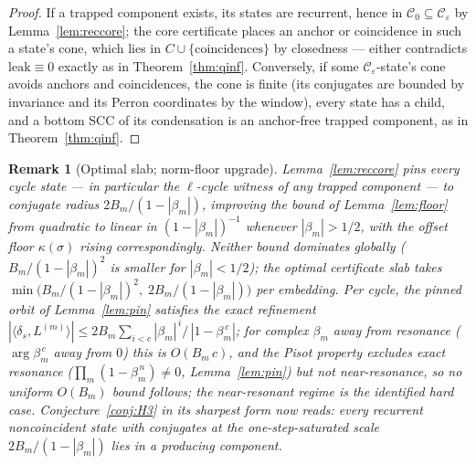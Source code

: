 \documentclass[11pt]{article}
\newtheorem{remark}[theorem]{Remark}
\begin{document}
\begin{proof}
If a trapped component exists, its states are recurrent, hence in
$\mathcal{C}_0\subseteq\mathcal{C}_\varepsilon$ by
Lemma~\ref{lem:reccore}; the core certificate places an anchor or
coincidence in such a state's cone, which lies in
$C\cup\{\text{coincidences}\}$ by closedness --- either contradicts
$\mathrm{leak}\equiv0$ exactly as in Theorem~\ref{thm:qinf}.
Conversely, if some $\mathcal{C}_\varepsilon$-state's cone avoids
anchors and coincidences, the cone is finite (its conjugates are
bounded by invariance and its Perron coordinates by the window), every
state has a child, and a bottom SCC of its condensation is an
anchor-free trapped component, as in Theorem~\ref{thm:qinf}.
\end{proof}

\begin{remark}[Optimal slab; norm-floor upgrade]\label{rem:optslab}
Lemma~\ref{lem:reccore} pins every cycle state --- in particular the
$\ell$-cycle witness of any trapped component --- to conjugate radius
$2B_m/(1-|\beta_m|)$, improving the bound of Lemma~\ref{lem:floor} from
quadratic to linear in $(1-|\beta_m|)^{-1}$ whenever $|\beta_m|>1/2$,
with the offset floor $\kappa(\sigma)$ rising correspondingly. Neither
bound dominates globally ($B_m/(1-|\beta_m|)^2$ is smaller for
$|\beta_m|<1/2$); the optimal certificate slab takes
$\min\bigl(B_m/(1-|\beta_m|)^2,\;2B_m/(1-|\beta_m|)\bigr)$ per
embedding. Per cycle, the pinned orbit of Lemma~\ref{lem:pin}
satisfies the exact refinement
$|\langle\delta_s,L^{(m)}\rangle|\le
2B_m\sum_{i<c}|\beta_m|^{\,i}/\,|1-\beta_m^{\,c}|$; for complex
$\beta_m$ away from resonance ($\arg\beta_m^{\,c}$ away from $0$) this
is $O(B_m\,c)$, and the Pisot property excludes exact resonance
($\prod_m(1-\beta_m^{\,n})\ne0$, Lemma~\ref{lem:pin}) but not
near-resonance, so no uniform $O(B_m)$ bound follows; the
near-resonant regime is the identified hard case. Conjecture~\ref{conj:H3}
in its sharpest form now reads: \emph{every recurrent noncoincident
state with conjugates at the one-step-saturated scale
$2B_m/(1-|\beta_m|)$ lies in a producing component.}
\end{remark}
\end{document}
